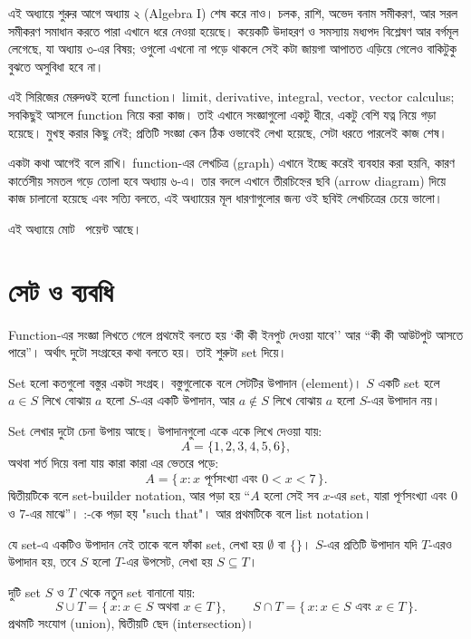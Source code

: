 \documentclass[11pt]{article}
\begin{document}

\noindent
এই অধ্যায়ে শুরুর আগে অধ্যায় ২ (Algebra I) শেষ করে নাও। চলক,
রাশি, অভেদ বনাম সমীকরণ, আর সরল সমীকরণ সমাধান করতে পারা এখানে ধরে নেওয়া
হয়েছে। কয়েকটি উদাহরণ ও সমস্যায় মধ্যপদ বিশ্লেষণ আর বর্গমূল লেগেছে, যা
অধ্যায় ৩-এর বিষয়; ওগুলো এখনো না পড়ে থাকলে সেই কটা জায়গা আপাতত এড়িয়ে
গেলেও বাকিটুকু বুঝতে অসুবিধা হবে না।

\noindent এই সিরিজের মেরুদণ্ডই হলো function। limit, derivative, integral, vector,
vector calculus; সবকিছুই আসলে function নিয়ে করা কাজ। তাই এখানে
সংজ্ঞাগুলো একটু ধীরে, একটু বেশি যত্ন নিয়ে গড়া হয়েছে। মুখস্থ করার কিছু নেই;
প্রতিটি সংজ্ঞা কেন ঠিক ওভাবেই লেখা হয়েছে, সেটা ধরতে পারলেই কাজ শেষ।

\noindent একটা কথা আগেই বলে রাখি। function-এর লেখচিত্র (graph) এখানে ইচ্ছে করেই
ব্যবহার করা হয়নি, কারণ কার্তেসীয় সমতল গড়ে তোলা হবে অধ্যায় ৬-এ। তার
বদলে এখানে তীরচিহ্নের ছবি (arrow diagram) দিয়ে কাজ চালানো হয়েছে
এবং সত্যি বলতে, এই অধ্যায়ের মূল ধারণাগুলোর জন্য ওই ছবিই লেখচিত্রের
চেয়ে ভালো।

\noindent এই অধ্যায়ে মোট \totalpoints\ পয়েন্ট আছে।

\section{সেট ও ব্যবধি}

Function-এর সংজ্ঞা লিখতে গেলে প্রথমেই বলতে হয় `কী কী ইনপুট দেওয়া যাবে''
আর ``কী কী আউটপুট আসতে পারে''। অর্থাৎ দুটো সংগ্রহের কথা বলতে হয়। তাই
শুরুটা set দিয়ে।

\begin{idea}[সেট]
Set হলো কতগুলো বস্তুর একটা সংগ্রহ। বস্তুগুলোকে বলে সেটটির উপাদান (element)।
$S$ একটি set হলে $a \in S$ লিখে বোঝায় $a$ হলো $S$-এর একটি উপাদান, আর
$a \notin S$ লিখে বোঝায় $a$ হলো $S$-এর উপাদান নয়।

Set লেখার দুটো চেনা উপায় আছে। উপাদানগুলো একে একে লিখে দেওয়া যায়:
\[
  A = \{1, 2, 3, 4, 5, 6\},
\]
অথবা শর্ত দিয়ে বলা যায় কারা কারা এর ভেতরে পড়ে:
\[
  A = \{\, x : x \text{ পূর্ণসংখ্যা এবং } 0 < x < 7 \,\}.
\]
দ্বিতীয়টিকে বলে set-builder notation, আর পড়া হয় ``$A$ হলো সেই সব $x$-এর set,
যারা পূর্ণসংখ্যা এবং $0$ ও $7$-এর মাঝে''। :-কে পড়া হয় "such that"। আর প্রথমটিকে বলে list notation।

যে set-এ একটিও উপাদান নেই তাকে বলে ফাঁকা set, লেখা হয় $\emptyset$ বা $\{\}$।
$S$-এর প্রতিটি উপাদান যদি $T$-এরও উপাদান হয়, তবে $S$ হলো $T$-এর উপসেট, লেখা
হয় $S \subseteq T$।

দুটি set $S$ ও $T$ থেকে নতুন set বানানো যায়:
\[
  S \cup T = \{\, x : x \in S \text{ অথবা } x \in T \,\}, \qquad
  S \cap T = \{\, x : x \in S \text{ এবং } x \in T \,\}.
\]
প্রথমটি সংযোগ (union), দ্বিতীয়টি ছেদ (intersection)।
\end{idea}
\end{document}
